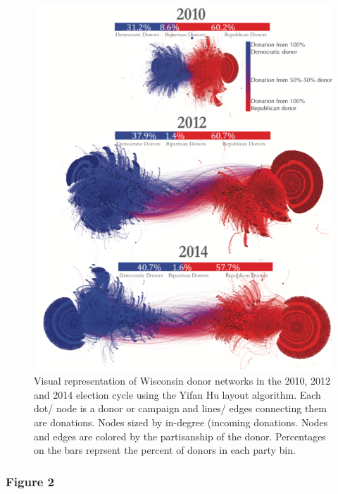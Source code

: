 \documentclass[12pt,]{article}
\begin{document}
\begin{figure}
\centering
\includegraphics{../figures/fig1.png}
\caption{Visual representation of Wisconsin donor networks in the 2010,
2012 and 2014 election cycle using the Yifan Hu layout algorithm. Each
dot/ node is a donor or campaign and lines/ edges connecting them are
donations. Nodes sized by in-degree (incoming donations. Nodes and edges
are colored by the partisanship of the donor. Percentages on the bars
reprsent the percent of donors in each party bin.}
\end{figure}

\newpage

\hypertarget{figure-2}{%
\subsubsection{Figure 2}\label{figure-2}}
\end{document}
